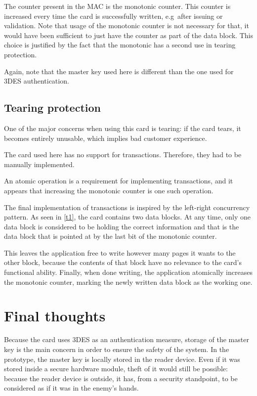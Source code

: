 \documentclass[paper=a4, fontsize=11pt]{scrartcl}
\begin{document}
The counter present in the MAC is the monotonic counter.
This counter is increased every time the card is successfully written, e.g\
after issuing or validation.
Note that usage of the monotonic counter is not necessary for that, it would
have been sufficient to just have the counter as part of the data block.
This choice is justified by the fact that the monotonic has a second use in
tearing protection.

Again, note that the master key used here is different than the one used for
3DES authentication.

\subsection{Tearing protection}

One of the major concerns when using this card is tearing: if the card tears, it
becomes entirely unusable, which implies bad customer experience.

The card used here has no support for transactions.
Therefore, they had to be manually implemented.

An atomic operation is a requirement for implementing transactions, and it
appears that increasing the monotonic counter is one such operation.

The final implementation of transactions is inspired by the left-right
concurrency pattern.
As seen in \autoref{t1}, the card contains two data blocks.
At any time, only one data block is considered to be holding the correct
information and that is the data block that is pointed at by the last bit of the
monotonic counter.

This leaves the application free to write however many pages it wants to the
other block, because the contents of that block have no relevance to the card's
functional ability.
Finally, when done writing, the application atomically increases the
monotonic counter, marking the newly written data block as the working one.

\section{Final thoughts}

Because the card uses 3DES as an authentication measure, storage of the master
key is the main concern in order to ensure the safety of the system.
In the prototype, the master key is locally stored in the reader device.
Even if it was stored inside a secure hardware module, theft of it would still
be possible: because the reader device is outside, it has, from a security
standpoint, to be considered as if it was in the enemy's hands.
\end{document}
